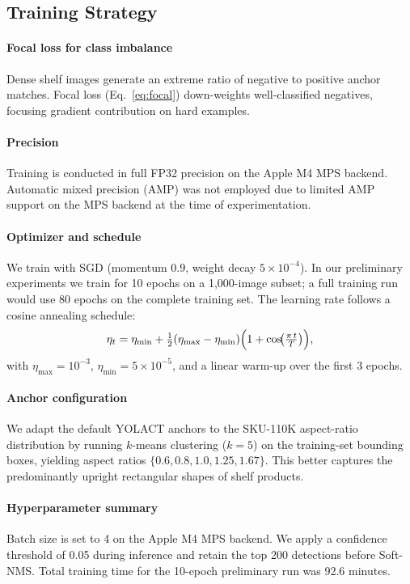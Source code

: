 \documentclass[conference]{IEEEtran}
\begin{document}
\subsection{Training Strategy}
\label{sec:training}

\paragraph{Focal loss for class imbalance}
Dense shelf images generate an extreme ratio of negative to positive
anchor matches. Focal loss (Eq.~\ref{eq:focal}) down-weights
well-classified negatives, focusing gradient contribution on hard
examples.

\paragraph{Precision}
Training is conducted in full FP32 precision on the Apple M4 MPS backend.
Automatic mixed precision (AMP) was not employed due to limited AMP
support on the MPS backend at the time of experimentation.

\paragraph{Optimizer and schedule}
We train with SGD (momentum $0.9$, weight decay $5 \times 10^{-4}$).
In our preliminary experiments we train for 10 epochs on a 1{,}000-image
subset; a full training run would use 80 epochs on the complete training
set. The learning rate follows a cosine annealing schedule:
\begin{equation}
  \eta_t = \eta_{\min} + \tfrac{1}{2}(\eta_{\max} - \eta_{\min})
           \Bigl(1 + \cos\!\bigl(\tfrac{\pi\,t}{T}\bigr)\Bigr),
  \label{eq:cosine}
\end{equation}
with $\eta_{\max} = 10^{-3}$, $\eta_{\min} = 5 \times 10^{-5}$, and a
linear warm-up over the first 3 epochs.

\paragraph{Anchor configuration}
We adapt the default YOLACT anchors to the SKU-110K aspect-ratio
distribution by running $k$-means clustering ($k=5$) on the training-set
bounding boxes, yielding aspect ratios $\{0.6, 0.8, 1.0, 1.25, 1.67\}$.
This better captures the predominantly upright rectangular shapes of shelf
products.

\paragraph{Hyperparameter summary}
Batch size is set to 4 on the Apple M4 MPS backend. We apply a
confidence threshold of 0.05 during inference and retain the top 200
detections before Soft-NMS. Total training time for the 10-epoch
preliminary run was 92.6 minutes.
\end{document}
